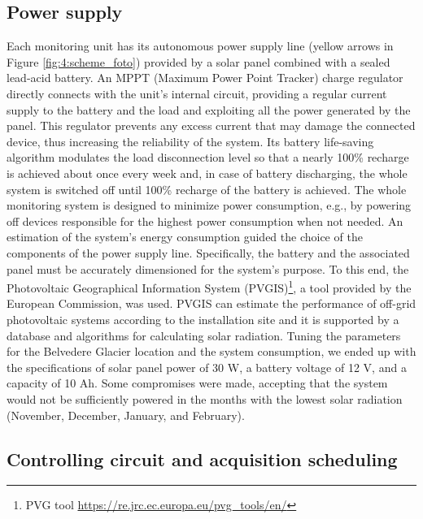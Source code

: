 \subsection{Power supply}\label{Power_supply}
Each monitoring unit has its autonomous power supply line (yellow arrows in Figure
\ref{fig:4:scheme_foto}) provided by a solar panel combined with a sealed lead-acid
battery. An MPPT (Maximum Power Point Tracker) charge regulator directly connects with
the unit's internal circuit, providing a regular current supply to the battery
and the load and exploiting all the power generated by the panel. This regulator prevents
any excess current that may damage the connected device, thus increasing the reliability of the system. 
Its battery life-saving algorithm modulates the load disconnection level
so that a nearly 100\% recharge is achieved about once every week and, in case of battery discharging, the whole system is switched off until 100\% recharge of the battery is achieved.
The whole monitoring system is designed to minimize power consumption, e.g., by powering off devices responsible for the highest power consumption when not needed.
An estimation of the system's energy consumption guided the choice of the components of the power supply line. 
Specifically, the battery and the associated panel must be accurately dimensioned for the system's purpose. 
To this end, the Photovoltaic Geographical Information System (PVGIS)\footnote{PVG tool \url{https://re.jrc.ec.europa.eu/pvg_tools/en/}}, a tool provided by the European Commission, was used.
PVGIS can estimate the performance of off-grid photovoltaic systems according to the installation site and it is supported by a database and algorithms for calculating solar radiation. 
Tuning the parameters for the Belvedere Glacier location and the system consumption, we ended up with the specifications of solar panel power of 30 W, a battery voltage of 12 V, and a capacity of 10 Ah. 
Some compromises were made, accepting that the system would not be sufficiently powered in the months with the lowest solar radiation (November, December, January, and February). 

\subsection{Controlling circuit and acquisition scheduling}\label{Control}

